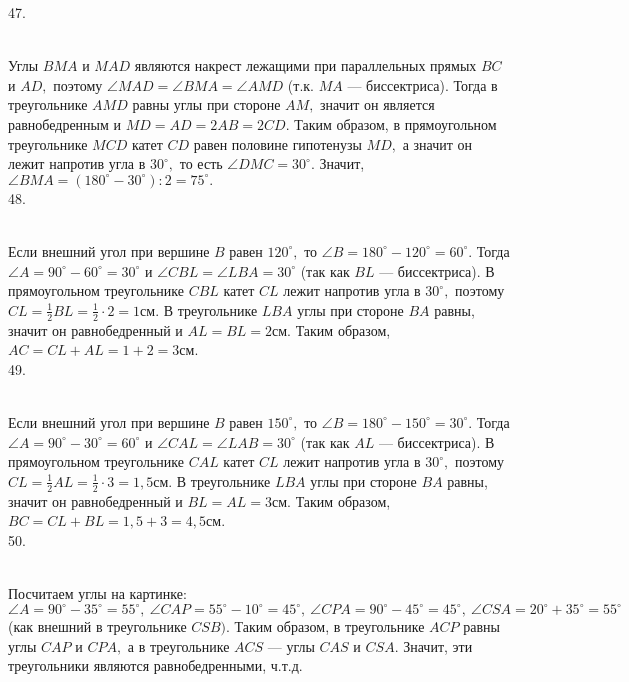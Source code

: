 47. \begin{figure}[ht!]
\end{figure}\\
Углы $BMA$ и $MAD$ являются накрест лежащими при параллельных прямых $BC$ и $AD,$ поэтому $\angle MAD=\angle BMA=\angle AMD$ (т.к. $MA$ --- биссектриса). Тогда в треугольнике $AMD$ равны углы при стороне $AM,$ значит он является равнобедренным и $MD=AD=2AB=2CD.$ Таким образом, в прямоугольном треугольнике $MCD$ катет $CD$ равен половине гипотенузы $MD,$ а значит он лежит напротив угла в $30^\circ,$ то есть $\angle DMC=30^\circ.$ Значит, $\angle BMA=(180^\circ-30^\circ):2=75^\circ.$\\
48. \begin{figure}[ht!]
\end{figure}\\
Если внешний угол при вершине $B$ равен $120^\circ,$ то $\angle B=180^\circ-120^\circ=60^\circ.$ Тогда $\angle A=90^\circ-60^\circ=30^\circ$ и $\angle CBL=\angle LBA=30^\circ$ (так как $BL$ --- биссектриса). В прямоугольном треугольнике $CBL$ катет $CL$ лежит напротив угла в $30^\circ,$ поэтому $CL=\frac{1}{2}BL=\frac{1}{2}\cdot2=1$см. В треугольнике $LBA$ углы при стороне $BA$ равны, значит он равнобедренный и $AL=BL=2$см. Таким образом, $AC=CL+AL=1+2=3$см.\\
49. \begin{figure}[ht!]
\end{figure}\\
Если внешний угол при вершине $B$ равен $150^\circ,$ то $\angle B=180^\circ-150^\circ=30^\circ.$ Тогда $\angle A=90^\circ-30^\circ=60^\circ$ и $\angle CAL=\angle LAB=30^\circ$ (так как $AL$ --- биссектриса). В прямоугольном треугольнике $CAL$ катет $CL$ лежит напротив угла в $30^\circ,$ поэтому $CL=\frac{1}{2}AL=\frac{1}{2}\cdot3=1,5$см. В треугольнике $LBA$ углы при стороне $BA$ равны, значит он равнобедренный и $BL=AL=3$см. Таким образом, $BC=CL+BL=1,5+3=4,5$см.\\
50. \begin{figure}[ht!]
\end{figure}\\
Посчитаем углы на картинке: $\angle A=90^\circ-35^\circ=55^\circ,\ \angle CAP=55^\circ-10^\circ=45^\circ,\ \angle CPA=90^\circ-45^\circ=45^\circ,\ \angle CSA=20^\circ+35^\circ=55^\circ$ (как внешний в треугольнике $CSB).$ Таким образом, в треугольнике $ACP$ равны углы $CAP$ и $CPA,$ а в треугольнике $ACS$ --- углы $CAS$ и $CSA.$ Значит, эти треугольники являются равнобедренными, ч.т.д.\\

